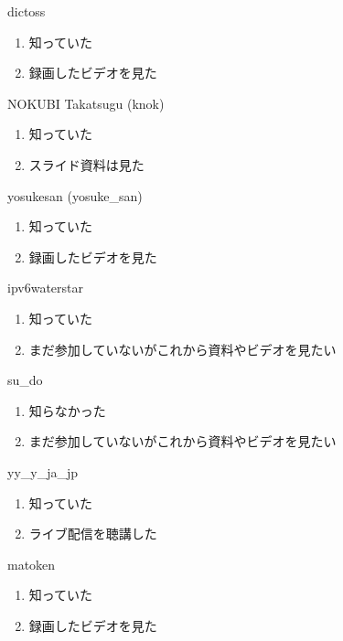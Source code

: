 \begin{prework}{ dictoss }
  \begin{enumerate}
  \item 知っていた
  \item 録画したビデオを見た
  \end{enumerate}
\end{prework}

\begin{prework}{ NOKUBI Takatsugu (knok) }
  \begin{enumerate}
  \item 知っていた
  \item スライド資料は見た
  \end{enumerate}
\end{prework}

\begin{prework}{ yosukesan (yosuke\_san) }
  \begin{enumerate}
  \item 知っていた
  \item 録画したビデオを見た
  \end{enumerate}
\end{prework}

\begin{prework}{ ipv6waterstar }
  \begin{enumerate}
  \item 知っていた
  \item まだ参加していないがこれから資料やビデオを見たい
  \end{enumerate}
\end{prework}

\begin{prework}{ su\_do }
  \begin{enumerate}
  \item 知らなかった
  \item まだ参加していないがこれから資料やビデオを見たい
  \end{enumerate}
\end{prework}

\begin{prework}{ yy\_y\_ja\_jp }
  \begin{enumerate}
  \item 知っていた
  \item ライブ配信を聴講した
  \end{enumerate}
\end{prework}

\begin{prework}{ matoken }
  \begin{enumerate}
  \item 知っていた
  \item 録画したビデオを見た
  \end{enumerate}
\end{prework}
